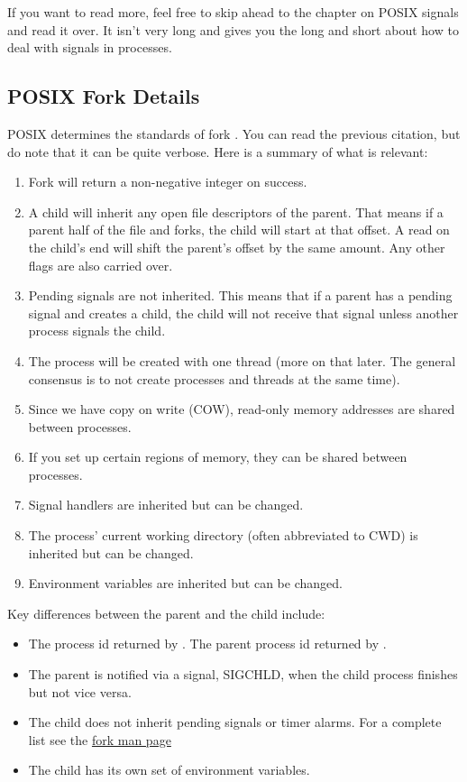 If you want to read more, feel free to skip ahead to the chapter on POSIX signals and read it over. It isn't very long and gives you the long and short about how to deal with signals in processes.

\subsection{POSIX Fork Details}

POSIX determines the standards of fork \cite{fork_2018}.
You can read the previous citation, but do note that it can be quite verbose.
Here is a summary of what is relevant:

\begin{enumerate}
    \item Fork will return a non-negative integer on success.
    \item A child will inherit any open file descriptors of the parent.
          That means if a parent half of the file and forks, the child will start at that offset.
          A read on the child's end will shift the parent's offset by the same amount.
          Any other flags are also carried over.
    \item Pending signals are not inherited.
          This means that if a parent has a pending signal and creates a child, the child will not receive that signal unless another process signals the child.
    \item The process will be created with one thread (more on that later. The general consensus is to not create processes and threads at the same time).
    \item Since we have copy on write (COW), read-only memory addresses are shared between processes.
    \item If you set up certain regions of memory, they can be shared between processes.
    \item Signal handlers are inherited but can be changed.
    \item The process' current working directory (often abbreviated to CWD) is inherited but can be changed.
    \item Environment variables are inherited but can be changed.
\end{enumerate}

Key differences between the parent and the child include:
\begin{itemize}
    \item The process id returned by .
          The parent process id returned by .
    \item The parent is notified via a signal, SIGCHLD, when the child process finishes but not vice versa.
    \item The child does not inherit pending signals or timer alarms.
          For a complete list see the \href{http://man7.org/linux/man-pages/man2/fork.2.html}{fork man page}
    \item The child has its own set of environment variables.
\end{itemize}

